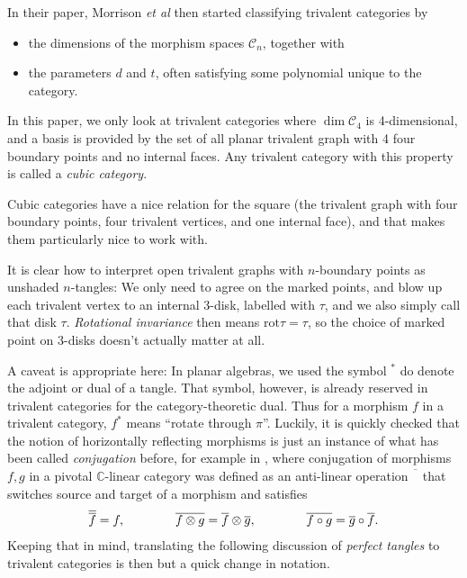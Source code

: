 \bigno In their paper, Morrison \emph{et al} then started classifying trivalent categories by
\begin{itemize}
\item[\text{a)}] the dimensions of the morphism spaces $\mathcal{C}_n$, together with
\item[\text{b)}] the parameters $d$ and $t$, often satisfying some polynomial unique to the category.
\end{itemize}

In this paper, we only look at trivalent categories where $\dim\mathcal{C}_4$ is 4-dimensional, and a basis is provided by the set of all planar trivalent graph with 4 four boundary points and no internal faces. Any trivalent category with this property is called a \emph{cubic category}.

Cubic categories have a nice relation for the square (the trivalent graph with four boundary points, four trivalent vertices, and one internal face), and that makes them particularly nice to work with.

\bigno
It is clear how to interpret open trivalent graphs with $n$-boundary points as unshaded $n$-tangles: We only need to agree on the marked points, and blow up each trivalent vertex to an internal $3$-disk, labelled with $\tau$, and we also simply call that disk $\tau$. \emph{Rotational invariance} then means $\mathrm{rot}\tau = \tau$, so the choice of marked point on $3$-disks doesn't actually matter at all.

A caveat is appropriate here: In planar algebras, we used the symbol ${}^*$ do denote the adjoint or dual of a tangle. That symbol, however, is already reserved in trivalent categories for the category-theoretic dual. Thus for a morphism $f$ in a trivalent category, $f^*$ means ``rotate through $\pi$''. Luckily, it is quickly checked that the notion of horizontally reflecting morphisms is just an instance of what has been called \emph{conjugation} before, for example in \cite{wang2010topological}, where conjugation of morphisms $f,g$ in a pivotal $\mathbb{C}$-linear category was defined as an anti-linear operation $\overline{\phantom{f}}$ that switches source and target of a morphism and satisfies
\begin{align*}
\overline{\overline{f}} = f,\qquad\qquad \overline{f\otimes g} = \overline{f}\otimes\overline{g},\qquad\qquad \overline{f\circ g} = \overline{g}\circ \overline{f}.
\end{align*}
Keeping that in mind, translating the following discussion of \emph{perfect tangles} to trivalent categories is then but a quick change in notation.